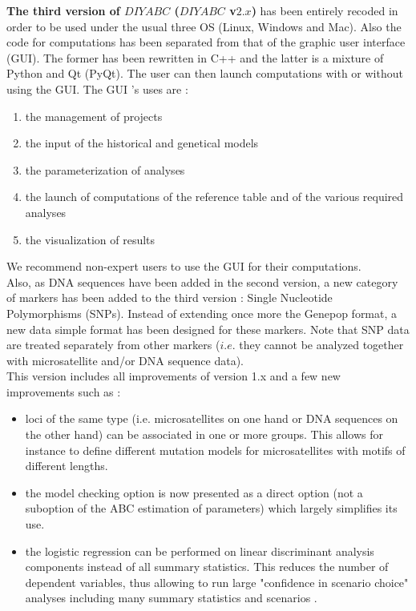 \documentclass [a4paper]{report}
\begin{document}
 \textbf{The third version of $DIYABC$ ($DIYABC$ v$2.x$)}  has been entirely recoded in order to be used under the usual three OS (Linux, Windows and Mac). Also the code for computations has been separated from that of the graphic user interface (GUI). The former has been rewritten in C++ and the latter is a mixture of Python and Qt (PyQt). The user can then launch computations with or without using the GUI. The GUI 's uses are : 

\begin{enumerate}
\item the management of projects
\item the input of the historical and genetical models
\item the parameterization of analyses
\item the launch of computations  of the reference table and of the various required analyses
\item the visualization of results
\end{enumerate}

We recommend non-expert users to use the GUI for their computations.\\

Also, as DNA sequences have been added in the second version, a new category of markers has been added to the third version : Single Nucleotide Polymorphisms (SNPs). Instead of extending once more the Genepop format, a new data simple format has been designed for these markers. Note that SNP data are treated separately from other markers ($i.e.$ they cannot be analyzed together with microsatellite and/or DNA sequence data).\\  

This version includes all improvements of version 1.x and a few new improvements such as :
\begin{itemize}
\item loci of the same type (i.e. microsatellites on one hand or DNA sequences on the other hand) can be associated in one or more groups. This allows for instance to define different mutation models for microsatellites with motifs of different lengths.
\item  the model checking option is now presented as a direct option (not a suboption of the ABC estimation of parameters) which largely simplifies its use.
\item the logistic regression can be performed on linear discriminant analysis components instead of all summary statistics. This reduces the number of dependent variables, thus allowing to run large "confidence in scenario choice" analyses including many summary statistics and scenarios \citep{EL2012}.
\end{itemize}
\end{document}
